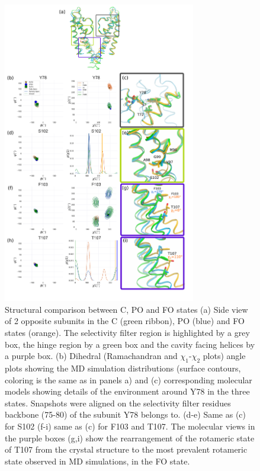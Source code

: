 \documentclass[%
 aip,
 amsmath,amssymb,
 preprint,%
]{revtex4-1}
\begin{document}
\begin{figure}[tbp]
\includegraphics[width=0.75\textwidth]{figures/bio.pdf}%
\caption{\label{bio} 
\scriptsize
    Structural comparison between C, PO and FO states (a) Side view of 2 opposite subunits in the C (green ribbon), PO (blue) and FO states (orange). The selectivity filter region is highlighted by a grey box, the hinge region by a green box and the cavity facing helices by a purple box. (b) Dihedral (Ramachandran and $\chi_1$-$\chi_2$ plots) angle plots showing the MD simulation distributions (surface contours, coloring is the same as in panels a) and (c) corresponding molecular models showing details of the environment around Y78 in the three states. Snapshots were aligned on the selectivity filter residues backbone (75-80) of the subunit Y78 belongs to. (d-e) Same as (c) for S102 (f-i) same as (c) for F103 and T107. The molecular views in the purple boxes (g,i) show the rearrangement of the rotameric state of T107 from the crystal structure to the most prevalent rotameric state observed in MD simulations, in the FO state.} 
\end{figure}
\end{document}
